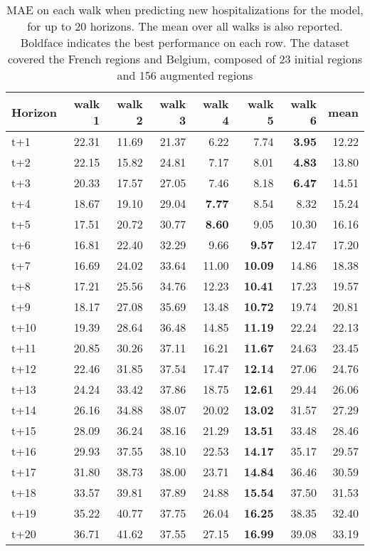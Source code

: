 \begin{table}[H]
\centering
\caption{MAE on each walk when predicting new hospitalizations for the model, for up to 20 horizons. The mean over all walks is also reported. Boldface indicates the best performance on each row. The dataset covered the French regions and Belgium, composed of 23 initial regions and 156 augmented regions }
\label{tab:MAE_walk_encoder_decoder}
\begin{tabular}{lrrrrrrr}
\toprule
Horizon &  walk 1 &  walk 2 &  walk 3 &  walk 4 &  walk 5 &  walk 6 &  mean \\
\midrule
t+1  & 22.31  & 11.69  & 21.37  & 6.22  & 7.74  & \textbf{3.95}  & 12.22  \\
t+2  & 22.15  & 15.82  & 24.81  & 7.17  & 8.01  & \textbf{4.83}  & 13.80  \\
t+3  & 20.33  & 17.57  & 27.05  & 7.46  & 8.18  & \textbf{6.47}  & 14.51  \\
t+4  & 18.67  & 19.10  & 29.04  & \textbf{7.77}  & 8.54  & 8.32  & 15.24  \\
t+5  & 17.51  & 20.72  & 30.77  & \textbf{8.60}  & 9.05  & 10.30  & 16.16  \\
t+6  & 16.81  & 22.40  & 32.29  & 9.66  & \textbf{9.57}  & 12.47  & 17.20  \\
t+7  & 16.69  & 24.02  & 33.64  & 11.00  & \textbf{10.09}  & 14.86  & 18.38  \\
t+8  & 17.21  & 25.56  & 34.76  & 12.23  & \textbf{10.41}  & 17.23  & 19.57  \\
t+9  & 18.17  & 27.08  & 35.69  & 13.48  & \textbf{10.72}  & 19.74  & 20.81  \\
t+10  & 19.39  & 28.64  & 36.48  & 14.85  & \textbf{11.19}  & 22.24  & 22.13  \\
t+11  & 20.85  & 30.26  & 37.11  & 16.21  & \textbf{11.67}  & 24.63  & 23.45  \\
t+12  & 22.46  & 31.85  & 37.54  & 17.47  & \textbf{12.14}  & 27.06  & 24.76  \\
t+13  & 24.24  & 33.42  & 37.86  & 18.75  & \textbf{12.61}  & 29.44  & 26.06  \\
t+14  & 26.16  & 34.88  & 38.07  & 20.02  & \textbf{13.02}  & 31.57  & 27.29  \\
t+15  & 28.09  & 36.24  & 38.16  & 21.29  & \textbf{13.51}  & 33.48  & 28.46  \\
t+16  & 29.93  & 37.55  & 38.10  & 22.53  & \textbf{14.17}  & 35.17  & 29.57  \\
t+17  & 31.80  & 38.73  & 38.00  & 23.71  & \textbf{14.84}  & 36.46  & 30.59  \\
t+18  & 33.57  & 39.81  & 37.89  & 24.88  & \textbf{15.54}  & 37.50  & 31.53  \\
t+19  & 35.22  & 40.77  & 37.75  & 26.04  & \textbf{16.25}  & 38.35  & 32.40  \\
t+20  & 36.71  & 41.62  & 37.55  & 27.15  & \textbf{16.99}  & 39.08  & 33.19  \\

\bottomrule
\end{tabular}
\end{table}
